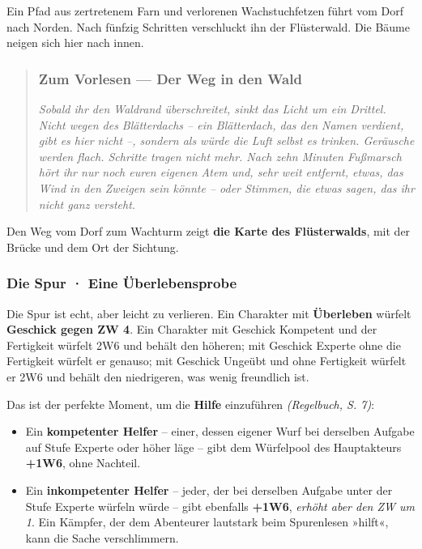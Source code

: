 \documentclass[10pt,a4paper]{article}
\newcommand{\tightlist}{\setlength{\itemsep}{0pt}\setlength{\parskip}{0pt}}
\begin{document}
Ein Pfad aus zertretenem Farn und verlorenen Wachstuchfetzen führt vom Dorf nach Norden. Nach fünfzig Schritten verschluckt ihn der Flüsterwald. Die Bäume neigen sich hier nach innen.

\begin{quote}
\subsubsection{Zum Vorlesen --- Der Weg in den Wald}\label{zum-vorlesen-im-wald}

\emph{Sobald ihr den Waldrand überschreitet, sinkt das Licht um ein Drittel. Nicht wegen des Blätterdachs -- ein Blätterdach, das den Namen verdient, gibt es hier nicht --, sondern als würde die Luft selbst es trinken. Geräusche werden flach. Schritte tragen nicht mehr. Nach zehn Minuten Fußmarsch hört ihr nur noch euren eigenen Atem und, sehr weit entfernt, etwas, das Wind in den Zweigen sein könnte -- oder Stimmen, die etwas sagen, das ihr nicht ganz versteht.}
\end{quote}

Den Weg vom Dorf zum Wachturm zeigt \textbf{die Karte des Flüsterwalds}, mit der Brücke und dem Ort der Sichtung.

\subsubsection{Die Spur · Eine Überlebensprobe}\label{die-spur-eine-uxfcberlebensprobe}

Die Spur ist echt, aber leicht zu verlieren. Ein Charakter mit \textbf{Überleben} würfelt \textbf{Geschick gegen ZW 4}. Ein Charakter mit Geschick Kompetent und der Fertigkeit würfelt 2W6 und behält den höheren; mit Geschick Experte ohne die Fertigkeit würfelt er genauso; mit Geschick Ungeübt und ohne Fertigkeit würfelt er 2W6 und behält den niedrigeren, was wenig freundlich ist.

Das ist der perfekte Moment, um die \textbf{Hilfe} einzuführen \emph{(Regelbuch, S. 7)}:

\begin{itemize}
\tightlist
\item
  Ein \textbf{kompetenter Helfer} -- einer, dessen eigener Wurf bei derselben Aufgabe auf Stufe Experte oder höher läge -- gibt dem Würfelpool des Hauptakteurs \textbf{+1W6}, ohne Nachteil.
\item
  Ein \textbf{inkompetenter Helfer} -- jeder, der bei derselben Aufgabe unter der Stufe Experte würfeln würde -- gibt ebenfalls \textbf{+1W6}, \emph{erhöht aber den ZW um 1}. Ein Kämpfer, der dem Abenteurer lautstark beim Spurenlesen »hilft«, kann die Sache verschlimmern.
\end{itemize}
\end{document}
